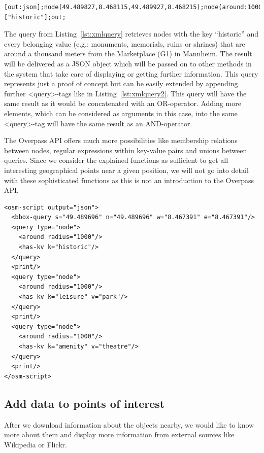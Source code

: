 \documentclass[journal]{IEEEtran}
\begin{document}
\begin{lstlisting}[caption={Overpass~query~in~Overpass~Query~Language},label={lst:overpassquery}]
[out:json];node(49.489827,8.468115,49.489927,8.468215);node(around:1000)["historic"];out;
\end{lstlisting}


The query from Listing~\ref{lst:xmlquery} retrieves nodes with the key ``historic'' and every belonging value (e.g.: monuments, memorials, ruins or shrines) that are around a thousand meters from the Marketplace (G1) in Mannheim. The result will be delivered as a JSON object which will be passed on to other methods in the system that take care of displaying or getting further information. This query represents just a proof of concept but can be easily extended by appending further <query>-tags like in Listing~\ref{lst:xmlquery2}. This query will have the same result as it would be concatenated with an OR-operator. Adding more elements, which can be considered as arguments in this case, into the same <query>-tag will have the same result as an AND-operator.

The Overpass API offers much more possibilities like membership relations between nodes, regular expressions within key-value pairs and unions between queries. Since we consider the explained functions as sufficient to get all interesting geographical points near a given position, we will not go into detail with these sophisticated functions as this is not an introduction to the Overpass API.

\begin{lstlisting}[caption={Enhanced~Overpass~query~in~XML~format},label={lst:xmlquery2}]
<osm-script output="json">
  <bbox-query s="49.489696" n="49.489696" w="8.467391" e="8.467391"/>
  <query type="node">
    <around radius="1000"/>
    <has-kv k="historic"/>
  </query>
  <print/>
  <query type="node">
    <around radius="1000"/>
    <has-kv k="leisure" v="park"/>
  </query>
  <print/>
  <query type="node">
    <around radius="1000"/>
    <has-kv k="amenity" v="theatre"/>
  </query>
  <print/>
</osm-script>
\end{lstlisting}


\subsection{Add data to points of interest}

After we download information about the objects nearby, we would like to know more about them and display more information from external sources like Wikipedia or Flickr.
\end{document}

